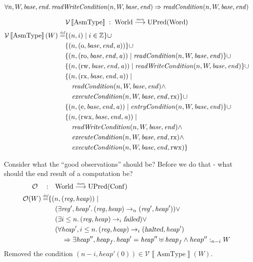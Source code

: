 \documentclass{article}
\newcommand{\sem}[1]{\left\llbracket #1 \right\rrbracket}
\newcommand{\monfun}{\stackrel{\textit{\tiny{mon}}}{\longrightarrow}}
\newcommand{\defeq}{\stackrel{\textit{\tiny{def}}}{=}}
\newcommand{\union}{\mathbin{\cup}}
\newcommand{\var}[1]{\mathit{#1}}
\newcommand{\addr}{\var{a}}
\newcommand{\start}{\var{base}}
\newcommand{\addrend}{\var{end}}
\newcommand{\reg}{\var{reg}}
\newcommand{\heap}{\var{heap}}
\newcommand{\perm}{\var{perm}}
\newcommand{\stdcap}[1][\perm]{\left(#1,\start,\addrend,\addr \right)}
\newcommand{\failed}{\textsl{failed}}
\newcommand{\halted}{\textsl{halted}}
\newcommand{\plainfun}[1]{\mathit{#1}}
\newcommand{\readCond}[1]{\plainfun{readCondition}(#1)}
\newcommand{\writeCond}[1]{\plainfun{readWriteCondition}(#1)}
\newcommand{\execCond}[1]{\plainfun{executeCondition}(#1)}
\newcommand{\entryCond}[1]{\plainfun{entryCondition}(#1)}
\newcommand{\heapSat}[3][\heap]{#1 :_{#2} #3}
\newcommand{\asmType}{\plaindom{AsmType}}
\newcommand{\plaindom}[1]{\mathrm{#1}}
\newcommand{\Words}{\plaindom{Word}}
\newcommand{\Confs}{\plaindom{Conf}}
\newcommand{\ints}{\mathbb{Z}}
\newcommand{\Worlds}{\plaindom{World}}
\newcommand{\UPred}[1]{\plaindom{UPred}(#1)}
\newcommand{\intr}[2]{\mathcal{#1}\sem{#2}}
\newcommand{\valueintr}[1]{\intr{V}{#1}}
\newcommand{\stdvr}{\valueintr{\asmType}}
\newcommand{\observations}{\mathcal{O}}
\newcommand{\npair}[2][n]{\left(#1,#2 \right)}
\newcommand{\plainperm}[1]{\mathrm{#1}}
\newcommand{\noperm}{\plainperm{o}}
\newcommand{\readonly}{\plainperm{ro}}
\newcommand{\readwrite}{\plainperm{rw}}
\newcommand{\exec}{\plainperm{rx}}
\newcommand{\entry}{\plainperm{e}}
\newcommand{\rwx}{\plainperm{rwx}}
\newcommand{\step}[1][]{\rightarrow_{#1}}
\begin{document}
\begin{lemma}
\[
\forall n, W, \start, \addrend \ldotp \writeCond{n,W,\start,\addrend} \Rightarrow \readCond{n,W,\start,\addrend}
\]
\end{lemma}
\[
\stdvr \; : \;  \Worlds \monfun \UPred{\Words}
\]
\begin{align*}
  \stdvr(W) \defeq & \{ \npair{i} \mid i \in \ints \} 
\union \\
                   & \{ \npair{\stdcap[\noperm] }  \} 
\union \\
                   & \{ \npair{\stdcap[\readonly] } \mid \readCond{n,W,\start,\addrend} \} \union \\
                   & \{ \npair{\stdcap[\readwrite] } \mid \writeCond{n,W,\start,\addrend} \} \union \\
                   & \{ \npair{\stdcap[\exec]} \mid \\
                   & \quad\readCond{n,W,\start,\addrend} \land \\
                   & \quad \execCond{n,W,\start,\addrend,\exec} \}
\union \\
                   & \{ \npair{\stdcap[\entry]} \mid \entryCond{n,W,\start,\addrend} \} \union \\
                   & \{ \npair{\stdcap[\rwx]} \mid \\
                   & \quad \writeCond{n,W,\start,\addrend} \land \\
                   & \quad \execCond{n,W,\start,\addrend,\exec} \land \\
                   & \quad \execCond{n,W,\start,\addrend,\rwx} \}
\end{align*}

Consider what the ``good observations'' should be? Before we do that - what should the end result of a computation be?
\begin{align*}
  \observations \quad : & \quad  \Worlds \monfun \UPred{\Confs} \\
  \observations (W) \defeq & \{ \npair{(\reg,\heap)} \mid \\
                           & \quad (\exists \reg', \heap' \ldotp (\reg,\heap) \step[n] (\reg',\heap')) \lor \\ %
                           & \quad (\exists i \leq n \ldotp (\reg,\heap) \step[i] \failed) \lor \\
                           & \quad (\forall \heap', i \leq n \ldotp (\reg,\heap) \step[i] (\halted,\heap')  \\
                           & \qquad \Rightarrow \exists \heap'', \heap_f \ldotp \heap' = \heap'' \uplus \heap_f \land \heapSat[heap'']{n-i}{W}
\end{align*}
Removed the condition $\npair[n-i]{\heap'(0)} \in \stdvr(W)$.\\
\end{document}
